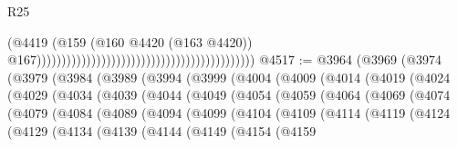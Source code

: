\begin{lexlean}{R25}
\begin{coremodule}
{{{{{{{{{{{{{{{{{{{{{{{{{{{{{{{{{{{{{{{{{{{{{{{{{{{{{{{{{{{{{{{{{{{{{{{{{{{{{{{{{{{{{{{{{{{{{{{{{{{{{{{{{{{{{{{{{{{{{{{{{{{{{{{{{{{{{{{{{{{{{{{{{{{{{{{{{{{{{{{{{{{{{{{{{{{{{{{{{{{{{{{{{{{{{{{{{{{{{{{                                                                                        (@4419
                                                                                          (@159
                                                                                            (@160
                                                                                              @4420
                                                                                              (@163
                                                                                                @4420))
                                                                                            @167))))))))))))))))))))))))))))))))))))))))))))
@4517 := @3964
    (@3969
      (@3974
        (@3979
          (@3984
            (@3989
              (@3994
                (@3999
                  (@4004
                    (@4009
                      (@4014
                        (@4019
                          (@4024
                            (@4029
                              (@4034
                                (@4039
                                  (@4044
                                    (@4049
                                      (@4054
                                        (@4059
                                          (@4064
                                            (@4069
                                              (@4074
                                                (@4079
                                                  (@4084
                                                    (@4089
                                                      (@4094
                                                        (@4099
                                                          (@4104
                                                            (@4109
                                                              (@4114
                                                                (@4119
                                                                  (@4124
                                                                    (@4129
                                                                      (@4134
                                                                        (@4139
                                                                          (@4144
                                                                            (@4149
                                                                              (@4154
                                                                                (@4159
}}}}}}}}}}}}}}}}}}}}}}}}}}}}}}}}}}}}}}}}}}}}}}}}}}}}}}}}}}}}}}}}}}}}}}}}}}}}}}}}}}}}}}}}}}}}}}}}}}}}}}}}}}}}}}}}}}}}}}}}}}}}}}}}}}}}}}}}}}}}}}}}}}}}}}}}}}}}}}}}}}}}}}}}}}}}}}}}}}}}}}}}}}}}}}}}}}}}}}}
\end{coremodule}
\end{lexlean}
